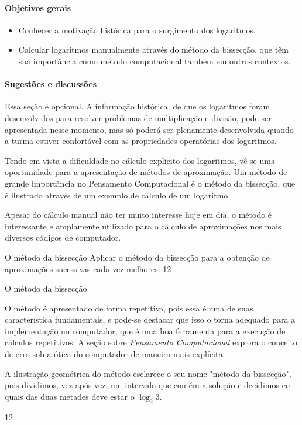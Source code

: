 \clearpage
\def\currentcolor{session3}
\begin{texto}
{	
	\paragraph{Objetivos gerais}
	\begin{itemize}
	\item Conhecer a motivação histórica para o surgimento dos logaritmos.
	\item Calcular logaritmos manualmente através do método da bissecção, que têm sua importância como método computacional também em outros contextos.
	\end{itemize}

	\paragraph{Sugestões e discussões}
	Essa seção é opcional. A informação histórica, de que os logaritmos foram desenvolvidos para resolver problemas de multiplicação e divisão, pode ser apresentada nesse momento, mas só poderá ser plenamente desenvolvida quando a turma estiver confortável com as propriedades operatórias dos logaritmos.

	Tendo em vista a dificuldade no cálculo explicito dos logaritmos, vê-se uma oportunidade para a apresentação de métodos de aproximação. Um método de grande importância no Pensamento Computacional é o método da bissecção, que é ilustrado através de um exemplo de cálculo de um logaritmo.

	Apesar do cálculo manual não ter muito interesse hoje em dia, o método é interessante e amplamente utilizado para o cálculo de aproximações nos mais diversos códigos de computador.
}
\end{texto}

\begin{objectives}{O método da bissecção}
{
	Aplicar o método da bissecção para a obtenção de aproximações sucessivas cada vez melhores.
}{1}{2}
\end{objectives}
\begin{sugestions}{O método da bissecção}
{
	O método é apresentado de forma repetitiva, pois essa é uma de suas característica fundamentais, e pode-se destacar que isso o torna adequado para a implementação no computador, que é uma boa ferramenta para a execução de cálculos repetitivos. A seção sobre \textit{Pensamento Computacional} explora o conceito de erro sob a ótica do computador de maneira mais explícita.

	A ilustração geométrica do método esclarece o seu nome "método da bissecção", pois dividimos, vez após vez, um intervalo que contém a solução e decidimos em quais das duas metades deve estar o $\log_2 3$. 
}{1}{2}
\end{sugestions}

